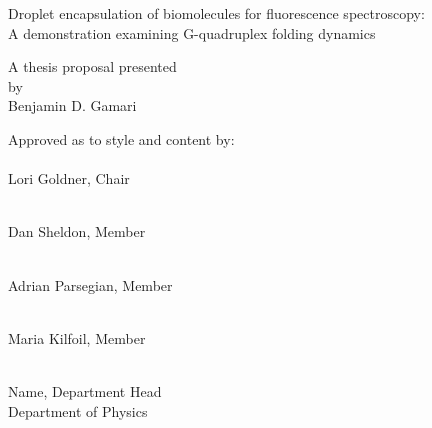 \begin{center}
\large{
Droplet encapsulation of biomolecules for fluorescence spectroscopy: \\
A demonstration examining G-quadruplex folding dynamics
}
\end{center}
\vspace{10em}
\begin{center}
A thesis proposal presented \\
by \\
{\sc Benjamin D. Gamari}
\end{center}
\vspace{10em}

Approved as to style and content by:\\

\makebox[2.5in]{\hrulefill} \\
Lori Goldner, Chair

\makebox[2.5in]{\hrulefill} \\
Dan Sheldon, Member

\makebox[2.5in]{\hrulefill} \\
Adrian Parsegian, Member

\makebox[2.5in]{\hrulefill} \\
Maria Kilfoil, Member

\vspace{10em}
\hspace{20em}
\parbox[t]{3in}{
\makebox[2.5in]{\hrulefill} \\
\hspace{20em} Name, Department Head \\
\hspace{20em} Department of Physics
}